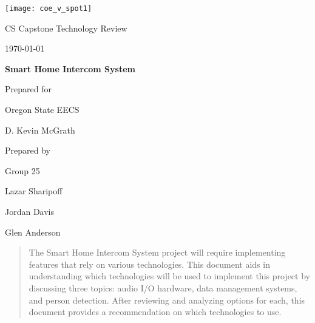 \documentclass[onecolumn, draftclsnofoot,10pt, compsoc]{IEEEtran}
\def \CapstoneTeamName{			Team 25}
\def \CapstoneTeamNumber{		25}
\def \GroupMemberOne{			Lazar Sharipoff}
\def \GroupMemberTwo{			Jordan Davis}
\def \GroupMemberThree{			Glen Anderson}
\def \CapstoneProjectName{		Smart Home Intercom System}
\def \CapstoneSponsorCompany{	Oregon State EECS}
\def \CapstoneSponsorPerson{		D. Kevin McGrath}
\def \DocType{		%
				Technology Review
				}
\newcommand{\NameSigPair}[1]{\par
\makebox[2.75in][r]{#1} \hfil 	\makebox[3.25in]{\makebox[2.25in]{\hrulefill} \hfill		\makebox[.75in]{\hrulefill}}
\par\vspace{-12pt} \textit{\tiny\noindent
\makebox[2.75in]{} \hfil		\makebox[3.25in]{\makebox[2.25in][r]{Signature} \hfill	\makebox[.75in][r]{Date}}}}
\renewcommand{\NameSigPair}[1]{#1}
\begin{document}
\begin{titlepage}
    \begin{singlespace}
    	\texttt{[image: coe\_v\_spot1]}
        \hfill 
        \par\vspace{.2in}
        \centering
        \scshape{
            \huge CS Capstone \DocType \par
            {\large\today}\par
            \vspace{.5in}
            \textbf{\Huge\CapstoneProjectName}\par
            \vfill
            {\large Prepared for}\par
            \Huge \CapstoneSponsorCompany\par
            \vspace{5pt}
            {\Large\NameSigPair{\CapstoneSponsorPerson}\par}
            {\large Prepared by }\par
            Group\CapstoneTeamNumber\par
            \vspace{5pt}
            {\Large
                \NameSigPair{\GroupMemberOne}\par
                \NameSigPair{\GroupMemberTwo}\par
                \NameSigPair{\GroupMemberThree}\par
            }
            \vspace{20pt}
        }
        \begin{abstract}
        The Smart Home Intercom System project will require implementing features that rely on various technologies.
	This document aids in understanding which technologies will be used to implement this project by discussing three topics: audio I/O hardware, data management systems, and person detection. After reviewing and analyzing options for each, this document provides a recommendation on which technologies to use.

	\end{abstract}     
    \end{singlespace}
\end{titlepage}
\newpage
{}
\tableofcontents
\clearpage
\end{document}
